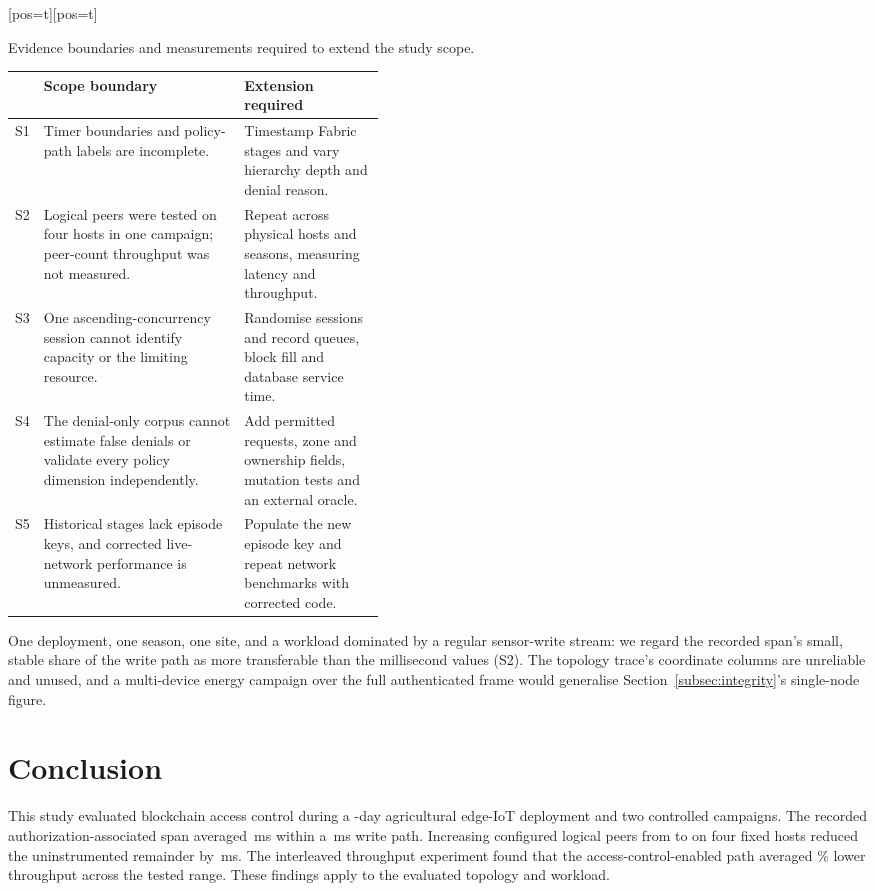 \documentclass[a4paper,fleqn]{cas-dc}
\makeatletter
\newenvironment{widetab}[1][pos=t]
  {\ifdoublecol \@nameuse{table*}[#1]\else \@nameuse{table}[#1]\fi}
  {\ifdoublecol \@nameuse{endtable*}\else \@nameuse{endtable}\fi}
\makeatother
\begin{document}
\begin{widetab}[pos=t]
\caption{Evidence boundaries and measurements required to extend the study scope.}
\label{tab:canonlimits}
\footnotesize
\begin{tabularx}{\linewidth}{@{}p{0.05\linewidth}Xp{0.38\linewidth}@{}}
\toprule
& Scope boundary & Extension required \\
\midrule
S1 & Timer boundaries and policy-path labels are incomplete. &
     Timestamp Fabric stages and vary hierarchy depth and denial reason. \\
S2 & Logical peers were tested on four hosts in one campaign; peer-count throughput was not measured. &
     Repeat across physical hosts and seasons, measuring latency and throughput. \\
S3 & One ascending-concurrency session cannot identify capacity or the limiting resource. &
     Randomise sessions and record queues, block fill and database service time. \\
S4 & The denial-only corpus cannot estimate false denials or validate every policy dimension independently. &
     Add permitted requests, zone and ownership fields, mutation tests and an external oracle. \\
S5 & Historical stages lack episode keys, and corrected live-network performance is unmeasured. &
     Populate the new episode key and repeat network benchmarks with corrected code. \\
\bottomrule
\end{tabularx}
\end{widetab}

One deployment, one season, one site, and a workload dominated by a
regular sensor-write stream: we regard the recorded span's small, stable
share of the write path as more transferable than the millisecond values
(S2). The topology trace's coordinate columns are unreliable and unused,
and a multi-device energy campaign over the full authenticated frame would
generalise Section~\ref{subsec:integrity}'s single-node figure.

\FloatBarrier
\section{Conclusion}
\label{sec:conclusion}

This study evaluated blockchain access control during a \DeployDays-day
agricultural edge-IoT deployment and two controlled campaigns. The recorded
authorization-associated span averaged \PartAccess\,ms within a
\PartTotal\,ms write path. Increasing configured logical peers from
\ScaleMinPeers{} to \ScaleMaxPeers{} on four fixed hosts reduced the
uninstrumented remainder by \PartEndorser\,ms. The interleaved throughput
experiment found that the access-control-enabled path averaged
\OverheadMeanPct\% lower throughput across the tested range. These findings
apply to the evaluated topology and workload.
\end{document}
